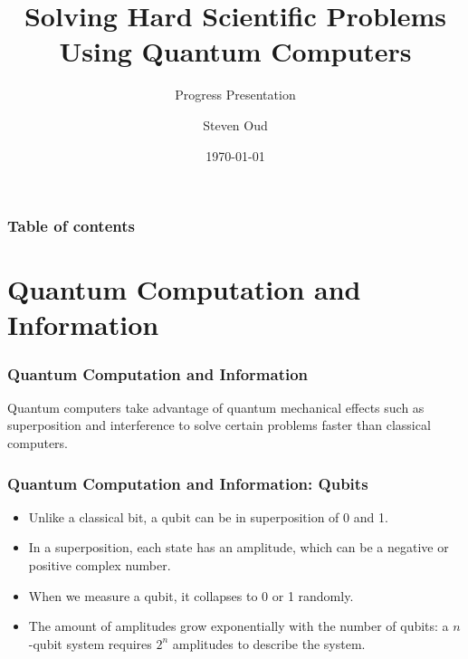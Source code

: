 \documentclass[pdf]{beamer}
\author{Steven Oud}
\title{{\LARGE Solving Hard Scientific Problems Using Quantum Computers}}
\subtitle{Progress Presentation}
\institute{Hogeschool van Amsterdam}
\date{\today}
\begin{document}
    \frame{\titlepage}
    
    \begin{frame}
    	\frametitle{Table of contents}
        \tableofcontents
    \end{frame}

    \section{Quantum Computation and Information}
    \begin{frame}
        \frametitle{Quantum Computation and Information}
        Quantum computers take advantage of quantum mechanical effects such as superposition and interference to solve certain problems faster than classical computers.
    \end{frame}

    \begin{frame}
        \frametitle{Quantum Computation and Information: Qubits}
        \begin{itemize}
            \item Unlike a classical bit, a qubit can be in superposition of 0 and 1.
            \item In a superposition, each state has an amplitude, which can be a negative or positive complex number.
            \item When we measure a qubit, it collapses to 0 or 1 randomly.
            \item The amount of amplitudes grow exponentially with the number of qubits: a $n$-qubit system requires $2^n$ amplitudes to describe the system.
        \end{itemize}
    \end{frame}
\end{document}
